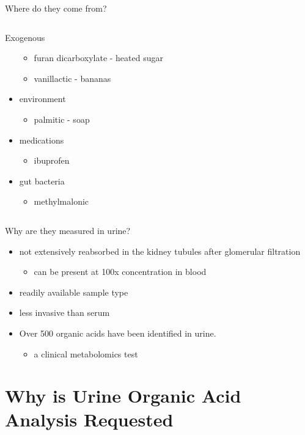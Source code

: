\documentclass[presentation, smaller]{beamer}
\begin{document}
\begin{frame}[label={sec:org167e6f1}]{Where do they come from?}
\begin{columns}
\begin{column}{0.45\columnwidth}
\begin{block}{Exogenous}
\begin{itemize}
\begin{itemize}
\item furan dicarboxylate - heated sugar
\item vanillactic - bananas
\end{itemize}
\item environment
\begin{itemize}
\item palmitic - soap
\end{itemize}
\item medications
\begin{itemize}
\item ibuprofen
\end{itemize}
\item gut bacteria
\begin{itemize}
\item methylmalonic
\end{itemize}
\end{itemize}
\end{block}
\end{column}
\end{columns}
\end{frame}

\begin{frame}[label={sec:org388034b}]{Why are they measured in urine?}
\begin{itemize}
\item not extensively reabsorbed in the kidney tubules after glomerular
filtration
\begin{itemize}
\item can be present at 100x concentration in blood
\end{itemize}
\item readily available sample type
\item less invasive than serum
\item Over 500 organic acids have been identified in urine.
\begin{itemize}
\item a clinical metabolomics test
\end{itemize}
\end{itemize}
\end{frame}

\section{Why is Urine Organic Acid Analysis Requested}
\label{sec:org54992d9}
\end{document}
